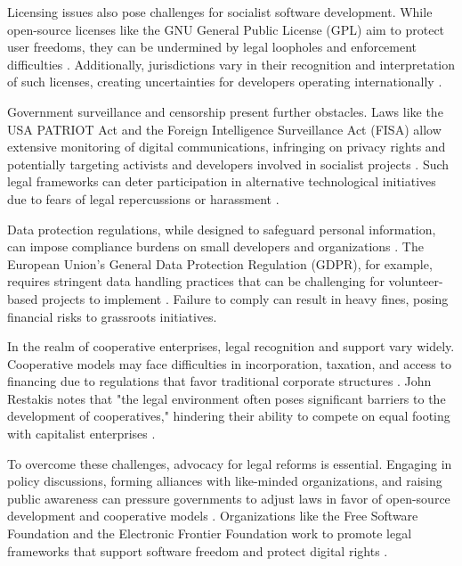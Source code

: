 \begin{refsection}
Licensing issues also pose challenges for socialist software development. While open-source licenses like the GNU General Public License (GPL) aim to protect user freedoms, they can be undermined by legal loopholes and enforcement difficulties \cite[pp.~33--35]{Meeker2008}. Additionally, jurisdictions vary in their recognition and interpretation of such licenses, creating uncertainties for developers operating internationally \cite[pp.~66--68]{Rosen2005}.

Government surveillance and censorship present further obstacles. Laws like the USA PATRIOT Act and the Foreign Intelligence Surveillance Act (FISA) allow extensive monitoring of digital communications, infringing on privacy rights and potentially targeting activists and developers involved in socialist projects \cite[pp.~120--122]{Greenwald2014}. Such legal frameworks can deter participation in alternative technological initiatives due to fears of legal repercussions or harassment \cite[pp.~95--98]{Snowden2019}.

Data protection regulations, while designed to safeguard personal information, can impose compliance burdens on small developers and organizations \cite[pp.~88--90]{Voigt2017}. The European Union's General Data Protection Regulation (GDPR), for example, requires stringent data handling practices that can be challenging for volunteer-based projects to implement \cite[pp.~105--107]{Voigt2017}. Failure to comply can result in heavy fines, posing financial risks to grassroots initiatives.

In the realm of cooperative enterprises, legal recognition and support vary widely. Cooperative models may face difficulties in incorporation, taxation, and access to financing due to regulations that favor traditional corporate structures \cite[pp.~136--138]{Restakis2010}. John Restakis notes that "the legal environment often poses significant barriers to the development of cooperatives," hindering their ability to compete on equal footing with capitalist enterprises \cite[pp.~137]{Restakis2010}.

To overcome these challenges, advocacy for legal reforms is essential. Engaging in policy discussions, forming alliances with like-minded organizations, and raising public awareness can pressure governments to adjust laws in favor of open-source development and cooperative models \cite[pp.~150--152]{Lessig2004}. Organizations like the Free Software Foundation and the Electronic Frontier Foundation work to promote legal frameworks that support software freedom and protect digital rights \cite{EFF2020}.


\end{refsection}
